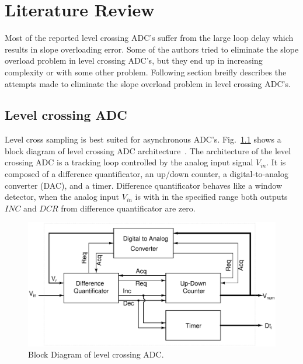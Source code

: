 \chapter{Literature Review}
	
\par
\hspace{0.6cm} Most of the reported level crossing ADC's suffer from the large loop delay which results in slope overloading error. Some of the authors tried to eliminate the slope overload problem in level crossing ADC's, but they end up in increasing complexity or with some other problem. Following section breifly describes the attempts made to eliminate the slope overload problem in level crossing ADC's.


\section{ Level crossing ADC}

\par
\hspace{0.6cm} Level cross sampling is best suited for asynchronous ADC's. Fig.~\ref{fig:REFA} shows a block diagram of level crossing ADC architecture~\cite{4672051}. The architecture of the level crossing ADC is a tracking loop controlled by the analog input signal $V_{in}$. It is composed of a difference quantificator, an up/down counter, a digital-to-analog converter (DAC), and a timer. Difference quantificator behaves like a window detector, when the analog input $V_{in}$ is with in the specified range both outputs $INC$ and $DCR$ from difference quantificator are zero. 

\begin{figure}[h]
	\begin{center}
		\includegraphics[scale=0.45]{./Figures/REFA.ps}
		\caption{Block Diagram of level crossing ADC.}
		\label{fig:REFA}
	\end{center}
\end{figure}


